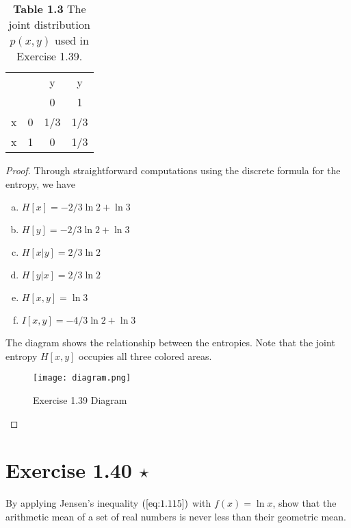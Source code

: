 \begin{table}[H]
    \centering
    \begin{tabular}{c c | c c}
        &  & y & y \\
        &  & 0 & 1 \\
        \hline
        x & 0 & 1/3 & 1/3 \\
        x & 1 & 0 & 1/3
    \end{tabular}
    \caption*{\textbf{Table 1.3} The joint distribution $p(x, y)$ used in Exercise 1.39.}
\end{table}

\vspace{1em}

\begin{proof}
    Through straightforward computations using the discrete formula for the entropy, we have
    \begin{multicols}{3}
        \begin{enumerate}[(a)]
            \item $H[x] = -2/3 \ln 2 + \ln 3$
            \item $H[y] = -2/3 \ln 2 + \ln 3$
            \item $H[x | y] = 2/3 \ln 2$
            \item $H[y | x] = 2/3 \ln 2$
            \item $H[x, y] = \ln 3$
            \item $I[x, y] = -4/3 \ln 2 + \ln 3$
        \end{enumerate}
    \end{multicols}

    The diagram shows the relationship between the entropies. Note that
    the joint entropy $H[x, y]$ occupies all three colored areas.

\begin{figure}
    \centering
    \texttt{[image: diagram.png]}
    \caption*{Exercise 1.39 Diagram}
\end{figure}
\end{proof}

\section*{Exercise 1.40 $\star$}
By applying Jensen's inequality $(\ref{eq:1.115})$ with $f(x) = \ln x$, show
that the arithmetic mean of a set of real numbers is never less than their
geometric mean.

\vspace{1em}

